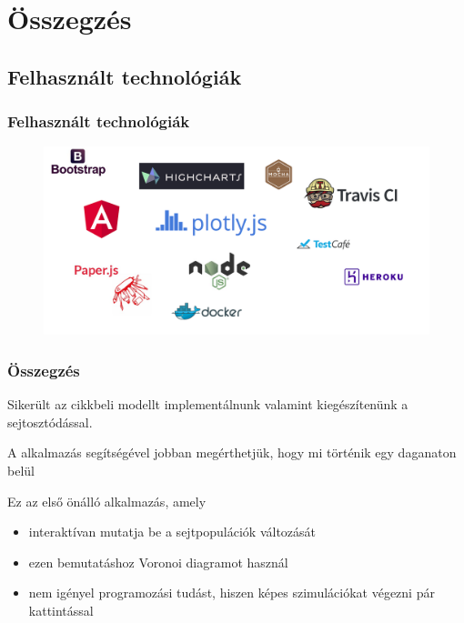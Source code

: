 \section{Összegzés}

\subsection{Felhasznált technológiák}
\begin{frame}
	\frametitle{Felhasznált technológiák}
	\begin{figure}[ht!]
		\centering
		\includegraphics[width=\linewidth]{images/technologies}
	\end{figure}
\end{frame}

\begin{frame}
\frametitle{Összegzés}

\begin{block}{}
Sikerült az \cite{archetti2016cooperation} cikkbeli modellt implementálnunk valamint kiegészítenünk a sejtosztódással.
\end{block}
\begin{block}{}
A alkalmazás segítségével jobban megérthetjük, hogy mi történik egy daganaton belül
\end{block}

\pause
\begin{block}{Ez az első önálló alkalmazás, amely}
\begin{itemize}
	\item interaktívan mutatja be a sejtpopulációk változását
	\pause
	\item ezen bemutatáshoz Voronoi diagramot használ
	\pause
	\item nem igényel programozási tudást, hiszen képes szimulációkat végezni pár kattintással
\end{itemize}
\end{block}
\end{frame}

